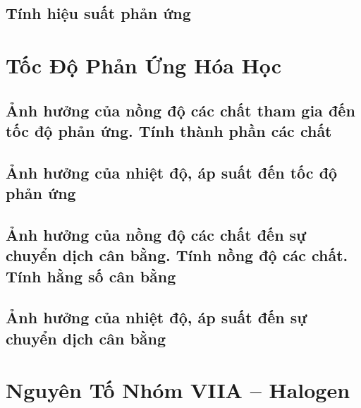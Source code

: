 \documentclass{article}
\numberwithin{equation}{section}
\begin{document}

\subsection{Tính hiệu suất phản ứng}


\section{Tốc Độ Phản Ứng Hóa Học}

\subsection{Ảnh hưởng của nồng độ các chất tham gia đến tốc độ phản ứng. Tính thành phần các chất}


\subsection{Ảnh hưởng của nhiệt độ, áp suất đến tốc độ phản ứng}


\subsection{Ảnh hưởng của nồng độ các chất đến sự chuyển dịch cân bằng. Tính nồng độ các chất. Tính hằng số cân bằng}


\subsection{Ảnh hưởng của nhiệt độ, áp suất đến sự chuyển dịch cân bằng}


\section{Nguyên Tố Nhóm VIIA -- Halogen}
\end{document}
